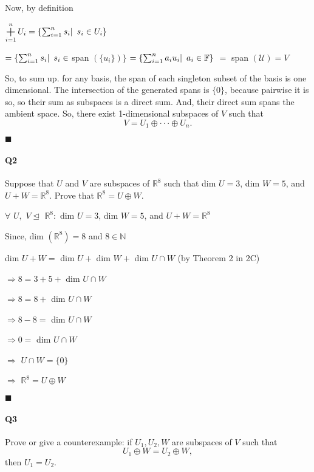 \documentclass{article}
\DeclareMathOperator*{\bigplus}{\scalerel*{+}{\textstyle\sum}}
\begin{document}
Now, by definition

$\bigplus\limits_{i=1}^n U_i = \{\sum_{i=1}^n
s_i|\enskip s_i \in U_i\}$

$=\{\sum_{i=1}^n s_i |\enskip s_i \in$ span $(\{u_i\})\}$
$=\{\sum_{i=1}^n a_iu_i|\enskip a_i \in \mathbb{F}\}$
$=$ span $(\mathcal{U}) = V$

So, to sum up. for any basis, the span of each singleton subset of the
basis is one dimensional. The intersection of the generated spans is
$\{0\}$, because pairwise it is so, so their sum as subspaces is a direct
sum. And, their direct sum spans the ambient space. So, there exist
1-dimensional subspaces of $V$ such that
\[V = U_1 ⊕ ··· ⊕ U_n.\]

\vspace{0.618 em}
$\blacksquare$

\newpage
\paragraph{Q2} Suppose that $U$ and $V$ are subspaces of $\mathbb{R}^8$ such that dim $U = 3$,
dim $W = 5$, and $U + W = \mathbb{R}^8$. Prove that $\mathbb{R}^8 = U ⊕ W$.

\vspace{0.618 em}

$\forall$ $U,$ $V \trianglelefteq$ $\mathbb{R}^8:$ dim $U = 3$,
dim $W = 5$, and $U + W = \mathbb{R}^8$

Since, dim $(\mathbb{R}^8) = 8$ and $8 \in \mathbb{N}$

dim $U + W =$ dim $U +$  dim $W +$  dim $U \cap W$ (by Theorem 2
in 2C)

$\Rightarrow 8 = 3 + 5 +$ dim $U \cap W$

$\Rightarrow 8 = 8 +$ dim $U \cap W$

$\Rightarrow 8 -8 = $ dim $U \cap W$

$\Rightarrow 0 = $ dim $U \cap W$

$\Rightarrow$ $U \cap W = \{0\}$

$\Rightarrow$ $\mathbb{R}^8 = U \oplus W$

\vspace{0.618 em}
$\blacksquare$



\paragraph{Q3} Prove or give a counterexample:
if $ U_1 , U_2 , W$ are subspaces of $V$ such that
\[U_1 ⊕ W = U_2 ⊕ W,\]
then $U_1 = U_2$.\\
\end{document}
